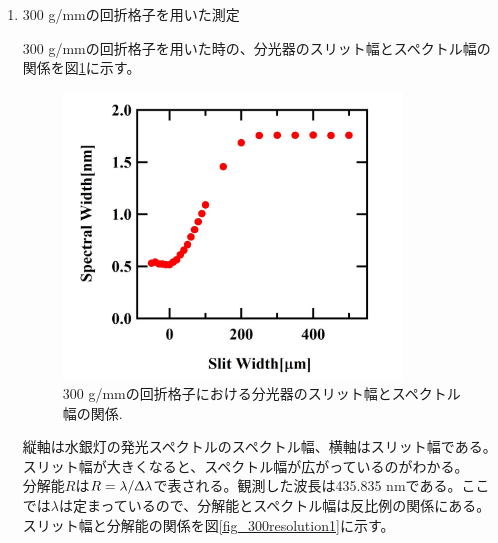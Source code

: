 \documentclass[11pt,a4j]{jsarticle}
\begin{document}
\begin{enumerate}%
 \item 300 g/mmの回折格子を用いた測定

       300 g/mmの回折格子を用いた時の、分光器のスリット幅とスペクトル幅の関係を図\ref{fig_300spectrum1}に示す。

       \begin{figure}[ht]
        \centering
        \includegraphics[clip,width=9cm]{start1_300Spectrum.jpg}
        \caption{300 g/mmの回折格子における分光器のスリット幅とスペクトル幅の関係.}
        \label{fig_300spectrum1}
       \end{figure}


       縦軸は水銀灯の発光スペクトルのスペクトル幅、横軸はスリット幅である。スリット幅が大きくなると、スペクトル幅が広がっているのがわかる。
       \\
       分解能$R$は$R=\lambda/\Updelta\lambda$で表される。観測した波長は435.835 nmである。ここでは$\lambda$は定まっているので、分解能とスペクトル幅は反比例の関係にある。スリット幅と分解能の関係を図\ref{fig_300resolution1}に示す。
       \newpage


\end{enumerate}
\end{document}
